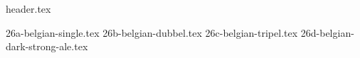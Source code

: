 \clearpage
{}
\divisorLine

{header.tex}

\begin{multicols}{2}

{26a-belgian-single.tex}
{26b-belgian-dubbel.tex}
{26c-belgian-tripel.tex}
{26d-belgian-dark-strong-ale.tex}

\end{multicols}